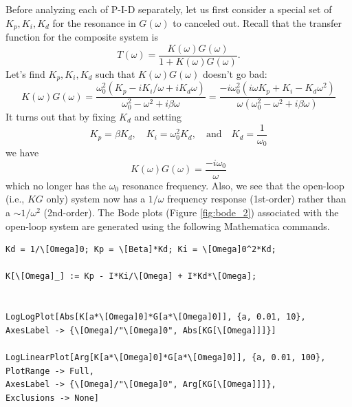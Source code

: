 \documentclass{article}
\theoremstyle{definition}
\newcommand{\f}[2]{\frac{#1}{#2}}
\begin{document}
Before analyzing each of P-I-D separately, let us first consider a special set of $K_p, K_i, K_d$ for the resonance in $G(\omega)$ to canceled out. Recall that the transfer function for the composite system is 
\begin{equation*}
T(\omega) = \f{K(\omega)G(\omega)}{1+K(\omega) G(\omega)}.
\end{equation*}
Let's find $K_p, K_i,K_d$ such that $K(\omega) G(\omega)$ doesn't go bad:
\begin{equation*}
K(\omega) G(\omega) = \f{\omega_0^2( K_p - iK_i/\omega + iK_d \omega)}{\omega_0^2 - \omega^2 + i\beta \omega} = \f{-i\omega_0^2( i\omega K_p + K_i - K_d \omega^2)}{\omega(\omega_0^2 - \omega^2 + i\beta \omega)} 
\end{equation*}
It turns out that by fixing $K_d$ and setting 
\begin{equation*}
K_p  =\beta K_d, \quad  K_i = \omega_0^2 K_d, \quad \text{and} \quad K_d = \f{1}{\omega_0}
\end{equation*}
we have
\begin{equation*}
K(\omega)G(\omega) = \f{-i\omega_0}{\omega}
\end{equation*}
which no longer has the $\omega_0$ resonance frequency. Also, we see that the open-loop (i.e., $KG$ only) system now has a $1/\omega$ frequency response (1st-order) rather than a $\sim 1/\omega^2$ (2nd-order). The Bode plots (Figure \ref{fig:bode_2}) associated with the open-loop system are generated using the following Mathematica commands. 
\begin{lstlisting}
Kd = 1/\[Omega]0; Kp = \[Beta]*Kd; Ki = \[Omega]0^2*Kd;

K[\[Omega]_] := Kp - I*Ki/\[Omega] + I*Kd*\[Omega]; 


LogLogPlot[Abs[K[a*\[Omega]0]*G[a*\[Omega]0]], {a, 0.01, 10}, 
AxesLabel -> {\[Omega]/"\[Omega]0", Abs[KG[\[Omega]]]}]

LogLinearPlot[Arg[K[a*\[Omega]0]*G[a*\[Omega]0]], {a, 0.01, 100}, 
PlotRange -> Full, 
AxesLabel -> {\[Omega]/"\[Omega]0", Arg[KG[\[Omega]]]}, 
Exclusions -> None]
\end{lstlisting}
\end{document}
